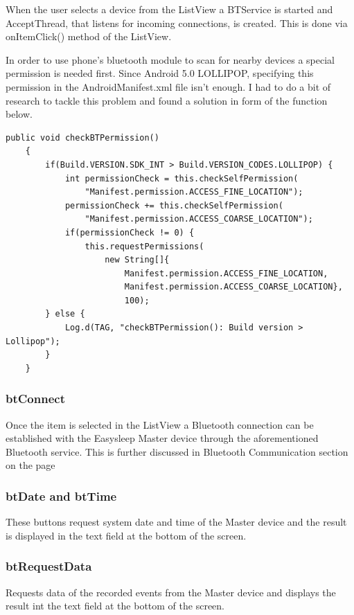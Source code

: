 \documentclass[12pt,a4paper]{article}
\begin{document}
    When the user selects a device from the ListView a BTService is started and AcceptThread, that listens for incoming connections, is created. This is done via onItemClick() method of the ListView.
    
    In order to use phone's bluetooth module to scan for nearby devices a special permission is needed first. Since Android 5.0 LOLLIPOP, specifying this permission in the AndroidManifest.xml file isn't enough. I had to do a bit of research to tackle this problem and found a solution in form of the function below.
    \begin{lstlisting}[label={lst:checkBTpermissions}, caption=checkBTpermissions()]
    public void checkBTPermission() 
    {
        if(Build.VERSION.SDK_INT > Build.VERSION_CODES.LOLLIPOP) {
            int permissionCheck = this.checkSelfPermission(
                "Manifest.permission.ACCESS_FINE_LOCATION");
            permissionCheck += this.checkSelfPermission(
                "Manifest.permission.ACCESS_COARSE_LOCATION");
            if(permissionCheck != 0) {
                this.requestPermissions(
                    new String[]{
                        Manifest.permission.ACCESS_FINE_LOCATION,
                        Manifest.permission.ACCESS_COARSE_LOCATION}, 
                        100);
        } else {
            Log.d(TAG, "checkBTPermission(): Build version > Lollipop");
        }
    }
    \end{lstlisting}
    
    \subsubsection*{btConnect}
    Once the item is selected in the ListView a Bluetooth connection can be established with the Easysleep Master device through the aforementioned Bluetooth service. This is further discussed in Bluetooth Communication section on the page ~\pageref{section:btCommunication}
    
    \subsubsection*{btDate and btTime}
    These buttons request system date and time of the Master device and the result is displayed in the text field at the bottom of the screen.
    
    \subsubsection*{btRequestData}
    Requests data of the recorded events from the Master device and displays the result int the text field at the bottom of the screen.
    
\end{document}
